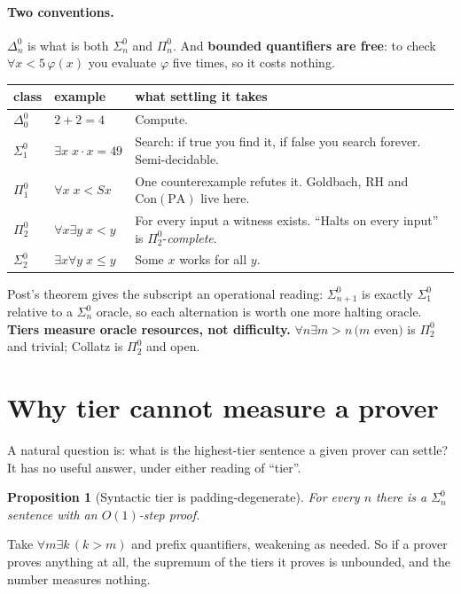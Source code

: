 \documentclass[11pt,a4paper]{article}
\newtheorem{proposition}{Proposition}
\newcommand{\Sig}[2]{\Sigma^{#1}_{#2}}
\newcommand{\Pai}[2]{\Pi^{#1}_{#2}}
\newcommand{\Del}[2]{\Delta^{#1}_{#2}}
\begin{document}
\paragraph{Two conventions.} $\Del{0}{n}$ is what is both $\Sig{0}{n}$ and
$\Pai{0}{n}$. And \textbf{bounded quantifiers are free}: to check $\forall x <
5\, \varphi(x)$ you evaluate $\varphi$ five times, so it costs nothing.

\begin{center}
\begin{tabular}{@{}llp{7.2cm}@{}}
\toprule
class & example & what settling it takes \\
\midrule
$\Del{0}{0}$ & $2+2 = 4$ & Compute. \\
$\Sig{0}{1}$ & $\exists x\; x\cdot x = 49$ & Search: if true you find it, if
false you search forever. Semi-decidable. \\
$\Pai{0}{1}$ & $\forall x\; x < Sx$ & One counterexample refutes it. Goldbach,
RH and $\mathrm{Con}(\mathrm{PA})$ live here. \\
$\Pai{0}{2}$ & $\forall x \exists y\; x < y$ & For every input a witness
exists. ``Halts on every input'' is $\Pai{0}{2}$-\emph{complete}. \\
$\Sig{0}{2}$ & $\exists x \forall y\; x \le y$ & Some $x$ works for all $y$. \\
\bottomrule
\end{tabular}
\end{center}

Post's theorem gives the subscript an operational reading: $\Sig{0}{n+1}$ is
exactly $\Sig{0}{1}$ relative to a $\Sig{0}{n}$ oracle, so each alternation is
worth one more halting oracle. \textbf{Tiers measure oracle resources, not
difficulty.} $\forall n \exists m > n\,(m$ even$)$ is $\Pai{0}{2}$ and trivial;
Collatz is $\Pai{0}{2}$ and open.

\section{Why tier cannot measure a prover}\label{sec:whynottier}

A natural question is: what is the highest-tier sentence a given prover can
settle? It has no useful answer, under either reading of ``tier''.

\begin{proposition}[Syntactic tier is padding-degenerate]
For every $n$ there is a $\Sig{0}{n}$ sentence with an $O(1)$-step proof.
\end{proposition}
Take $\forall m \exists k\,(k>m)$ and prefix quantifiers, weakening as needed.
So if a prover proves anything at all, the supremum of the tiers it proves is
unbounded, and the number measures nothing.
\end{document}
